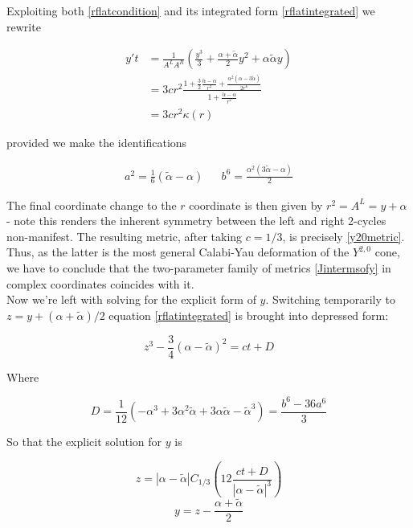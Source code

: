 Exploiting both \ref{rflatcondition} and its integrated form \ref{rflatintegrated} we rewrite

\begin{align}
	y't & = \frac{1}{A^L A^R} \left( \frac{y^3}{3} + \frac{\alpha + \tilde{\alpha}}{2} y^2 + \alpha \tilde{\alpha} y \right)\\
	& = 3cr^2 \frac{1+ \frac{3}{2} \frac{\tilde{\alpha} - \alpha}{r^2} + \frac{\alpha^{2}(\alpha - 3 \tilde{\alpha})}{2r^6} }{1+ \frac{\tilde{\alpha} -\alpha}{r^2} }\\
	& = 3cr^2 \kappa(r)
\end{align}

provided we make the identifications

\begin{align}
	a^2 = \frac{1}{6}(\tilde{\alpha} - \alpha) && b^6 = \frac{\alpha^{2}(3\tilde{\alpha}-\alpha)}2
	\label{<++>}
\end{align}

The final coordinate change to the $r$ coordinate is then given by $r^2 = A^L = y + \alpha$ - note this renders the inherent symmetry between the left and right 2-cycles non-manifest. The resulting metric, after taking $c=1/3$, is precisely \ref{y20metric}. Thus, as the latter is the most general Calabi-Yau deformation of the $Y^{2,0}$ cone, we have to conclude that the two-parameter family of metrics \ref{Jintermsofy} in complex coordinates coincides with it.\\

Now we're left with solving for the explicit form of $y$. Switching temporarily to $z = y + (\alpha + \tilde\alpha)/2$ equation \ref{rflatintegrated} is brought into depressed form:

\begin{equation}
	z^3 - \frac{3}4 (\alpha - \tilde\alpha)^2 = ct + D
	\label{depressed}
\end{equation}

Where

\begin{equation}
	D = \frac{1}{12}(-\alpha^3 + 3 \alpha^2 \tilde\alpha + 3 \alpha\tilde{\alpha} - \tilde{\alpha}^3) = \frac{b^6-36a^6}{3}
	\label{dprime}
\end{equation}

So that the explicit solution for $y$ is

\begin{equation}
	z = |\alpha - \tilde \alpha| C_{1/3} \left( 12 \frac{ct + D}{|\alpha-\tilde\alpha|^3} \right) 
	\label{explicitz}
\end{equation}
\begin{equation}
	y = z - \frac{\alpha + \tilde{\alpha}}2
	\label{explicitY}
\end{equation}

